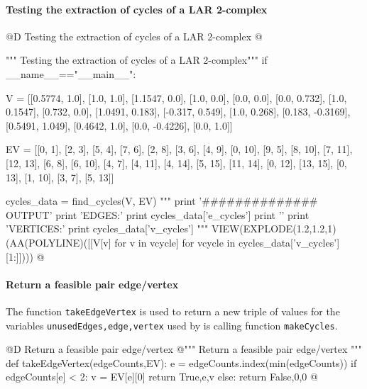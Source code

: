 \documentclass[11pt,oneside]{article}    %
\begin{document}
\paragraph{Testing the extraction of cycles of a LAR 2-complex}
@D Testing the extraction of cycles of a LAR 2-complex
@{""" Testing the extraction of cycles of a LAR 2-complex"""
if __name__=="__main__":

    V = [[0.5774, 1.0], [1.0, 1.0], [1.1547, 0.0], [1.0, 0.0], [0.0, 0.0], [0.0, 0.732], [1.0, 0.1547], [0.732, 0.0], [1.0491, 0.183], [-0.317, 0.549], [1.0, 0.268], [0.183, -0.3169], [0.5491, 1.049], [0.4642, 1.0], [0.0, -0.4226], [0.0, 1.0]]
                                                                                                                                                                                 
    EV = [[0, 1], [2, 3], [5, 4], [7, 6], [2, 8], [3, 6], [4, 9], [0, 10], [9, 5], [8, 10], [7, 11], [12, 13], [6, 8], [6, 10], [4, 7], [4, 11], [4, 14], [5, 15], [11, 14], [0, 12], [13, 15], [0, 13], [1, 10], [3, 7], [5, 13]]
    
    cycles_data = find_cycles(V, EV)
    """
    print '############## OUTPUT'
    print 'EDGES:'
    print cycles_data['e_cycles']
    print '\n'
    print 'VERTICES:'
    print cycles_data['v_cycles']
    """
    VIEW(EXPLODE(1.2,1.2,1)(AA(POLYLINE)([[V[v] for v in vcycle] for vcycle in cycles_data['v_cycles'][1:]])))
@}


\paragraph{Return a feasible pair edge/vertex}
The function \texttt{takeEdgeVertex} is used to return a new triple of values for the variables \texttt{unusedEdges,edge,vertex} used by is calling function \texttt{makeCycles}.

@D Return a feasible pair edge/vertex
@{""" Return a feasible pair edge/vertex """ 
def takeEdgeVertex(edgeCounts,EV):
    e = edgeCounts.index(min(edgeCounts))
    if edgeCounts[e] < 2: 
        v = EV[e][0]
        return True,e,v
    else: return False,0,0
@}
\end{document}
